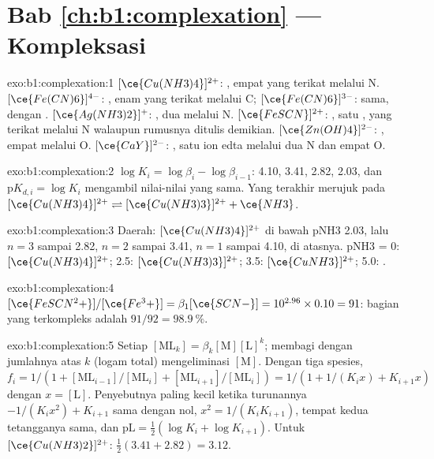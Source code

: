 \section*{Bab \ref{ch:b1:complexation} --- Kompleksasi}

\begin{solution}{exo:b1:complexation:1}
$[\ce{Cu(NH3)4}]^{2+}$: , empat  yang terikat melalui N.
$[\ce{Fe(CN)6}]^{4-}$: , enam  yang terikat melalui C;
$[\ce{Fe(CN)6}]^{3-}$: sama, dengan . $[\ce{Ag(NH3)2}]^{+}$:
, dua  melalui N. $[\ce{FeSCN}]^{2+}$: , satu
, yang terikat melalui N walaupun rumusnya ditulis demikian.
$[\ce{Zn(OH)4}]^{2-}$: , empat  melalui O.
$[\ce{CaY}]^{2-}$: , satu ion edta melalui dua N dan empat O.
\end{solution}

\begin{solution}{exo:b1:complexation:2}
$\log K_i = \log\beta_i - \log\beta_{i-1}$: 4.10, 3.41, 2.82, 2.03, dan
$\mathrm{p}K_{d,i} = \log K_i$ mengambil nilai-nilai yang sama. Yang
terakhir merujuk pada
$[\ce{Cu(NH3)4}]^{2+} \rightleftharpoons [\ce{Cu(NH3)3}]^{2+} + \ce{NH3}$.
\end{solution}

\begin{solution}{exo:b1:complexation:3}
Daerah: $[\ce{Cu(NH3)4}]^{2+}$ di bawah pNH3 2.03, lalu $n = 3$ sampai
2.82, $n = 2$ sampai 3.41, $n = 1$ sampai 4.10,  di atasnya.
pNH3 = 0: $[\ce{Cu(NH3)4}]^{2+}$; 2.5: $[\ce{Cu(NH3)3}]^{2+}$; 3.5:
$[\ce{CuNH3}]^{2+}$; 5.0: .
\end{solution}

\begin{solution}{exo:b1:complexation:4}
$[\ce{FeSCN^2+}]/[\ce{Fe^3+}] = \beta_1[\ce{SCN-}] = 10^{2.96} \times 0.10 =
91$: bagian yang terkompleks adalah $91/92 = \qty{98.9}{\percent}$.
\end{solution}

\begin{solution}{exo:b1:complexation:5}
Setiap $[\mathrm{ML}_k] = \beta_k[\mathrm{M}][\mathrm{L}]^k$; membagi
dengan jumlahnya atas $k$ (logam total) mengeliminasi $[\mathrm{M}]$.
Dengan tiga spesies, $f_i = 1/(1 + [\mathrm{ML}_{i-1}]/[\mathrm{ML}_i] +
[\mathrm{ML}_{i+1}]/[\mathrm{ML}_i]) = 1/(1 + 1/(K_i x) + K_{i+1}x)$ dengan
$x = [\mathrm{L}]$. Penyebutnya paling kecil ketika turunannya
$-1/(K_i x^2) + K_{i+1}$ sama dengan nol, $x^2 = 1/(K_iK_{i+1})$, tempat
kedua tetangganya sama, dan $\mathrm{pL} = \frac12(\log K_i + \log K_{i+1})$.
Untuk $[\ce{Cu(NH3)2}]^{2+}$: $\frac12(3.41 + 2.82) = 3.12$.
\end{solution}

